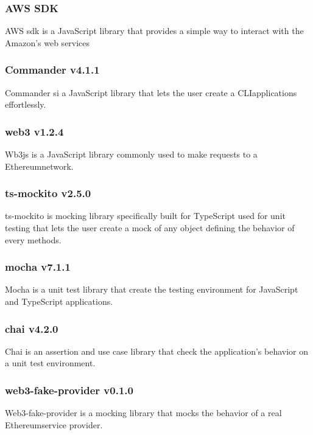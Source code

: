 \subsubsection*{AWS SDK }
AWS sdk is a JavaScript library that provides a simple way to interact with the Amazon’s web services

\subsubsection*{Commander v4.1.1}
Commander si a JavaScript library that lets the user create a CLI\glo applications effortlessly.

\subsubsection*{web3 v1.2.4}
Wb3js is a JavaScript library commonly used to make requests to a Ethereum\glo network.

\subsubsection*{ts-mockito v2.5.0}
ts-mockito is mocking library specifically built for TypeScript used for unit testing that lets the user create a mock of any object defining the behavior of every methods.

\subsubsection*{mocha v7.1.1}
Mocha is a unit test library that create the testing environment for JavaScript and TypeScript applications.

\subsubsection*{chai v4.2.0}
Chai is an assertion and use case library that check the application's behavior on a unit test environment.

\subsubsection*{web3-fake-provider v0.1.0}
Web3-fake-provider is a mocking library that mocks the behavior of a real Ethereum\glo service provider.

